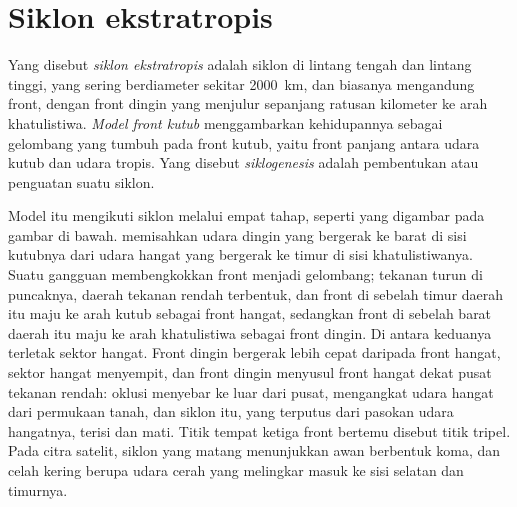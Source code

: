 \section{Siklon ekstratropis}\label{sec:b2:weather-systems:cyclones}

\begin{definition}\label{def:b2:weather-systems:cyclones}
Yang disebut \emph{siklon ekstratropis} adalah siklon di lintang tengah dan lintang
tinggi, yang sering berdiameter sekitar \qty{2000}{km}, dan biasanya mengandung front, dengan front dingin yang menjulur
sepanjang ratusan kilometer ke arah khatulistiwa. \emph{Model front kutub}
menggambarkan kehidupannya sebagai gelombang yang tumbuh pada front kutub, yaitu front panjang antara udara kutub
dan udara tropis. Yang disebut \emph{siklogenesis} adalah pembentukan atau penguatan
suatu siklon.
\end{definition}

Model itu mengikuti siklon melalui empat tahap, seperti yang digambar pada gambar di bawah.  memisahkan udara dingin yang bergerak ke barat di sisi kutubnya dari udara hangat yang bergerak ke timur di sisi
khatulistiwanya. Suatu gangguan membengkokkan front menjadi gelombang; tekanan turun di puncaknya,
daerah tekanan rendah terbentuk, dan front di sebelah timur daerah itu maju ke arah kutub sebagai front hangat, sedangkan front di sebelah barat
daerah itu maju ke arah khatulistiwa sebagai front dingin. Di antara keduanya terletak sektor hangat. Front dingin
bergerak lebih cepat daripada front hangat, sektor hangat menyempit, dan front dingin menyusul front
hangat dekat pusat tekanan rendah: oklusi menyebar ke luar dari pusat, mengangkat udara hangat dari
permukaan tanah, dan siklon itu, yang terputus dari pasokan udara hangatnya, terisi dan mati. Titik tempat
ketiga front bertemu disebut titik tripel. Pada citra satelit, siklon yang matang menunjukkan
awan berbentuk koma, dan celah kering berupa udara cerah yang melingkar masuk ke sisi selatan dan timurnya.

